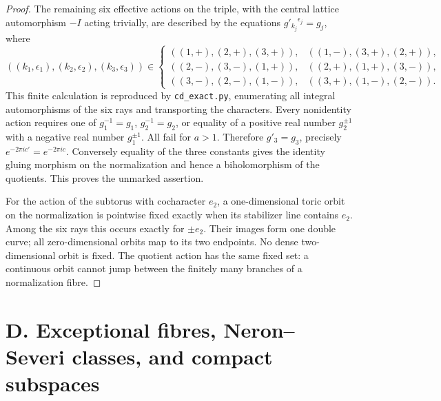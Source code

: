 \begin{proof}
The remaining six effective actions on the triple, with the central
lattice automorphism \(-I\) acting trivially, are described by the equations
\(g'_{k_j}{}^{\epsilon_j}=g_j\), where
\[
 ((k_1,\epsilon_1),(k_2,\epsilon_2),(k_3,\epsilon_3))
 \in\left\{
\begin{array}{lll}
((1,+),(2,+),(3,+)),&((1,-),(3,+),(2,+)),\\
((2,-),(3,-),(1,+)),&((2,+),(1,+),(3,-)),\\
((3,-),(2,-),(1,-)),&((3,+),(1,-),(2,-)).
\end{array}\right.
\]
This finite calculation is reproduced by \texttt{cd\_exact.py}, enumerating
all integral automorphisms of the six rays and transporting the characters.
Every nonidentity action requires one of
\(g_1^{-1}=g_1\), \(g_2^{-1}=g_2\), or equality of a positive real number
\(g_2^{\pm1}\) with a negative real number \(g_1^{\pm1}\).
All fail for \(a>1\). Therefore \(g'_3=g_3\), precisely
\(e^{-2\pi ic'}=e^{-2\pi ic}\). Conversely equality of the three constants
gives the identity gluing morphism on the normalization and hence a
biholomorphism of the quotients. This proves the unmarked assertion.

For the action of the subtorus with cocharacter \(e_2\), a one-dimensional
toric orbit on the normalization is pointwise fixed exactly when its
stabilizer line contains \(e_2\). Among the six rays this occurs exactly
for \(\pm e_2\). Their images form one double curve; all zero-dimensional
orbits map to its two endpoints. No dense two-dimensional orbit is fixed.
The quotient action has the same fixed set: a continuous orbit cannot
jump between the finitely many branches of a normalization fibre.
\end{proof}

\section{D. Exceptional fibres, Neron--Severi classes, and compact subspaces}
